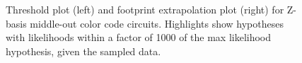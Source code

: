 \documentclass[onecolumn,unpublished,a4paper]{quantumarticle}
\theoremstyle{definition}
\theoremstyle{definition}
\theoremstyle{definition}
\begin{document}
\begin{figure}
    \centering
    \hfill
    \caption{
        Threshold plot (left) and footprint extrapolation plot (right) for Z-basis middle-out color code circuits.
        Highlights show hypotheses with likelihoods within a factor of 1000 of the max likelihood hypothesis, given the sampled data.
    }
    \label{fig:midout-z}
\end{figure}
\end{document}
